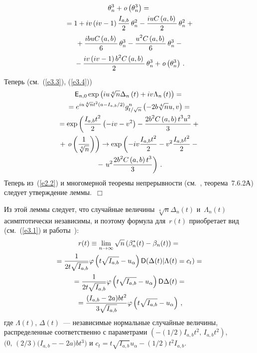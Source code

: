 \begin{multicols}{2}
\begin{multline*}
\theta_{n}^{3} + {\it o}\left(\theta_{n}^{3} \right) ={}\\
{}= 
1 + iv\left(iv - 1\right)\displaystyle\frac{\displaystyle I_{a,b}\mathstrut}{\displaystyle 2\mathstrut}\,
\theta_{n}^{2} - \displaystyle\frac{\displaystyle iuC\left(a,b\right)\mathstrut}{\displaystyle 2\mathstrut}\,\theta_{n}^{2}+{}\\
{}+
 \displaystyle\frac{\displaystyle ibuC\left(a,b\right)\mathstrut}{\displaystyle 6\mathstrut}\,
\theta_{n}^{3}- \displaystyle\frac{\displaystyle u^{2}C\left(a,b\right)\mathstrut}{\displaystyle 6\mathstrut}\,\theta_{n}^{3} -{}\\
{}-
 \displaystyle\frac{\displaystyle iv\left(iv - 1\right)b^{2} C\left(a,b\right)\mathstrut}{\displaystyle 2\mathstrut}\,
\theta_{n}^{3} + {\it o}\left(\theta_{n}^{3}\right)\,.
\end{multline*}
Теперь (см.~(\ref{e3.3}), (\ref{e3.4}))
\begin{multline*}
{{\sf E}}_{n,0} \exp\left(iu\sqrt[{4}]{n} \Delta_{n}
\left(t\right) + iv\Lambda_{n}
\left(t\right)\right) ={}\\
{}=
 e^{iu\sqrt[{4}]{n}t^{2}\left(a
-I_{a,b}/2\right)} g_{t/\sqrt{n}}^{n}\left(-2b
\sqrt[{4}]{n}u, v\right) ={}\\
{}
= \exp\left(\displaystyle\frac{\displaystyle I_{a,b} t^{2} \mathstrut}{\displaystyle 2\mathstrut}\left(-iv - v^{2}\right) -
\displaystyle\frac{\displaystyle 2b^{2}C\left(a,b\right)t^{3}u^{2}\mathstrut}{\displaystyle 3\mathstrut}+{}\right.\\
{}+\left. {\it o}
\left(\displaystyle\frac{\displaystyle 1\mathstrut}{\displaystyle \sqrt[{4}]{n}\mathstrut}\right)\right)\to
\exp \left(-iv\displaystyle\frac{\displaystyle I_{a,b}t^{2}\mathstrut}{\displaystyle 2\mathstrut} - v^{2}\displaystyle\frac{\displaystyle I_{a,b}t^{2}\mathstrut}{\displaystyle 2\mathstrut} -{}\right.\\
{}-\left.u^{2}
\displaystyle\frac{\displaystyle 2b^{2}C\left(a,b\right)t^{3}\mathstrut}{\displaystyle 3\mathstrut} \right)\,.
\end{multline*}
Теперь  из~(\ref{e2.2}) и  многомерной теоремы непрерывности (см.~\cite{2be},
теорема~7.6.2А) следует утверждение лем\-мы.~$\Box$

Из этой леммы следует, что случайные величины $\sqrt[4] n
\Delta_n(t)$ и~$\Lambda_n(t)$ асимптотически независимы, и поэтому
формула для~$r(t)$ приобретает вид (см.~(\ref{e3.1}) и работы~\cite{1be, 5be, 6be}):
\begin{multline}
r(t) \equiv \lim_{n \to \infty} {\sqrt
n\left(\beta_n^*(t)-\beta_n(t)\right)}={}\\
{}
=\displaystyle\frac{\displaystyle 1\mathstrut}{\displaystyle 2t\sqrt{I_{a,b}}\mathstrut}\varphi\left(t\sqrt{I_{a,b}}-u_{\alpha}\right)
{\sf D}(\Delta(t)|\Lambda(t)=c_t) ={}\\
{}=
\displaystyle\frac{\displaystyle 1\mathstrut}{\displaystyle 2t\sqrt{I_{a,b}}\mathstrut}\varphi\left(t\sqrt{I_{a,b}}-u_{\alpha}\right)
{\sf D} \Delta(t)={}\\
{}
= \displaystyle\frac{\displaystyle (I_{a,b} - 2a)bt^2\mathstrut}{\displaystyle 3\sqrt{I_{a,b}}\mathstrut}
\varphi\left (t\sqrt{I_{a,b}} - u_{\alpha}\right )\,, 
\label{e3.10}
\end{multline}
где $\Lambda(t)$, $\Delta(t)$~--- независимые нормальные случайные
величины, распределенные  соответственно с параметрами
$(-(1/2)I_{a,b}t^2,\,I_{a,b}t^2)$, $(0,\,
(2/3)(I_{a,b}-$\linebreak $-\;2a)bt^3)$ и
$c_t=t\sqrt{I_{a,b}}u_{\alpha}-(1/2)t^2 I_{a,b}$.


\end{multicols}

